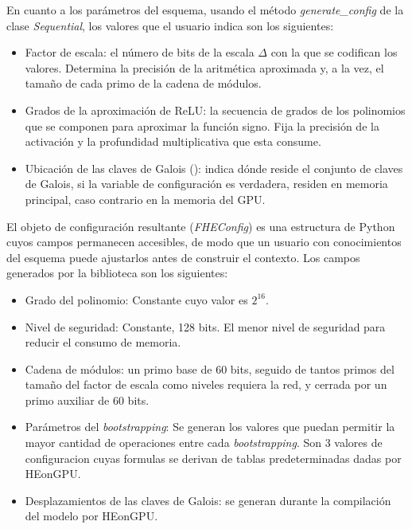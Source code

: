 En cuanto a los parámetros del esquema, usando el método \textit{generate\_config} de la clase \textit{Sequential}, los valores que el usuario indica son los siguientes: 

\begin{itemize}
    \item Factor de escala: el número de bits de la escala $\Delta$ con la que se codifican los valores. Determina la precisión de la aritmética aproximada y, a la vez, el tamaño de cada primo de la cadena de módulos.

    \item Grados de la aproximación de ReLU: la secuencia de grados de los polinomios que se componen para aproximar la función signo. Fija la precisión de la activación y la profundidad multiplicativa que esta consume.

    \item Ubicación de las claves de Galois (): indica dónde reside el conjunto de claves de Galois, si la variable de configuración es verdadera, residen en memoria principal, caso contrario en la memoria del GPU.
\end{itemize}

El objeto de configuración resultante (\textit{FHEConfig}) es una estructura de Python cuyos campos permanecen accesibles, de modo que un usuario con conocimientos del esquema puede ajustarlos antes de construir el contexto. Los campos generados por la biblioteca son los siguientes:

\begin{itemize}
    \item Grado del polinomio: Constante cuyo valor es $2^{16}$. 

    \item Nivel de seguridad: Constante, 128 bits. El menor nivel de seguridad para reducir el consumo de memoria.

    \item Cadena de módulos: un primo base de 60 bits, seguido de tantos primos del tamaño del factor de escala como niveles requiera la red, y cerrada por un primo auxiliar de 60 bits. 

    \item Parámetros del \textit{bootstrapping}: Se generan los valores que puedan permitir la mayor cantidad de operaciones entre cada \textit{bootstrapping}. Son 3 valores de configuracion cuyas formulas se derivan de tablas predeterminadas dadas por HEonGPU.

    \item Desplazamientos de las claves de Galois: se generan durante la compilación del modelo por HEonGPU. 
\end{itemize}

